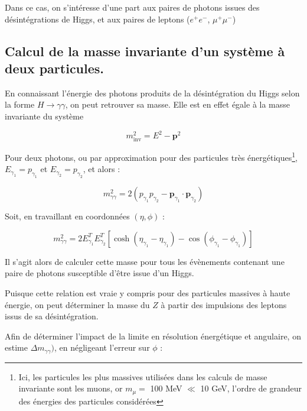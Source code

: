 \documentclass[11pt]{article} %
\begin{document}
Dans ce cas, on s'intéresse d'une part aux paires de photons issues des désintégrations de Higgs, et aux paires de leptons ($e^+e^-$, $\mu^+\mu^-$)


\subsection{Calcul de la masse invariante d'un système à deux particules.}

En connaissant l'énergie des photons produits de la désintégration du Higgs selon la forme $H\to \gamma \gamma$, on peut retrouver sa masse. Elle est en effet égale à la masse invariante du système 

\begin{equation}
m_{\textrm{inv}}^2 = E^2 - \textbf{p}^2
\end{equation}

Pour deux photons,  ou par approximation pour des particules très énergétiques\footnote{Ici, les particules les plus massives utilisées dans les calculs de masse invariante sont les muons, or $m_\mu = $ 100 MeV $\ll $ 10 GeV, l'ordre de grandeur des énergies des particules considérées}, $E_{\gamma_1} = p_{\gamma_1}$ et $E_{\gamma_2} = p_{\gamma_2}$, et alors :

\begin{equation}
m_{\gamma \gamma}^2 = 2 \left ( p_{\gamma_1} p_{\gamma_2} - \textbf{p}_{\gamma_1} \cdot \textbf{p}_{\gamma_2} \right )
\end{equation}

Soit, en travaillant en coordonnées $(\eta, \phi)$ :

\begin{equation}
m_{\gamma \gamma}^2 = 2 E_{\gamma_1}^T E_{\gamma_2}^T \left [ \cosh {\left( \eta_{\gamma_1} - \eta_{\gamma_1} \right)} - \cos{\left( \phi_{\gamma_1} - \phi_{\gamma_1} \right)} \right ]
\end{equation}

Il s'agit alors de calculer cette masse pour tous les évènements contenant une paire de photons susceptible d'être issue d'un Higgs. 

Puisque cette relation est vraie y compris pour des particules massives à haute énergie, on peut déterminer la masse du $Z$ à partir des impulsions des leptons issus de sa désintégration.

Afin  de déterminer l'impact de la limite en résolution énergétique et angulaire, on estime $\Delta m_{\gamma\gamma})$, en négligeant l'erreur sur $\phi$ :
\end{document}
